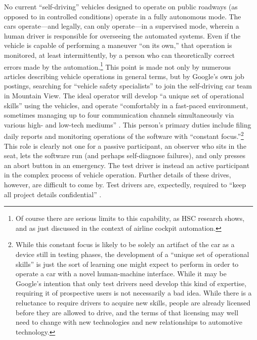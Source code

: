 No current ``self-driving'' vehicles designed to operate on public
roadways (as opposed to in controlled conditions) operate in a fully
autonomous mode. The cars operate---and legally, can only
operate---in
a supervised mode, wherein a human driver is responsible for
overseeing the automated systems. Even if the vehicle is capable of
performing a maneuver ``on its own,'' that operation is monitored, at
least intermittently, by a person who can theoretically correct errors
made by the automation.\footnote{Of course there are serious
  limits to this capability, as HSC research shows, and as just discussed
  in the context of airline cockpit automation.} This point is made not
only by numerous articles describing vehicle operations in general terms,
but by Google's
own job postings, searching for ``vehicle safety specialists'' to join
the self-driving car team in Mountain View. The ideal operator will
develop ``a unique set of operational skills'' using the vehicles, and
operate ``comfortably in a fast-paced environment, sometimes managing
up to four communication channels simultaneously via various high- and
low-tech mediums'' \cite{googleJobPosting}. This person's primary
duties include filing daily reports and monitoring operations of the
software with ``constant focus.''\footnote{While this constant focus
  is likely to be solely an artifact of the car as a device still in
  testing phases, the development of a ``unique set of operational
  skills'' is just the sort of learning one might expect to perform in
order to operate a car with a novel human-machine interface. While it
may be Google's intention that only test drivers need develop this
kind of expertise, requiring it of prospective users is not
necessarily a bad idea. While there is a reluctance to require drivers
to acquire new skills, people are already licensed before they are
allowed to drive, and the terms of that licensing may well need to
change with new technologies and new relationships to automotive
technology.} This role is clearly not one for a passive participant,
an observer who sits in the seat, lets the software run (and perhaps
self-diagnose failures), and only presses an abort button in an
emergency. The test driver is instead an active participant in the
complex process of 
vehicle operation. Further details of these drives, however,
are difficult to come by. Test drivers are, expectedly, required to
``keep all project details confidential'' \cite{googleJobPosting}.


